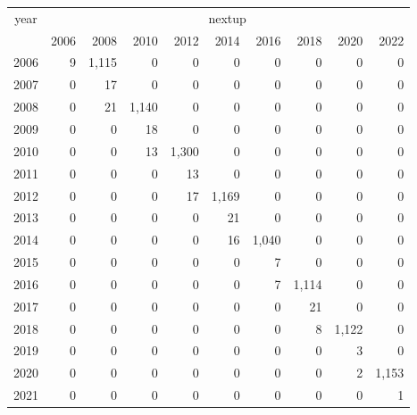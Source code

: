 \footnotesize\begin{tabular}[t]{lrrrrrrrrr}
\toprule
\multicolumn{1}{c}{year} & \multicolumn{9}{c}{nextup} \\
\cmidrule(l{3pt}r{3pt}){1-1} \cmidrule(l{3pt}r{3pt}){2-10}
  & 2006 & 2008 & 2010 & 2012 & 2014 & 2016 & 2018 & 2020 & 2022\\
\midrule
2006 & 9 & 1,115 & 0 & 0 & 0 & 0 & 0 & 0 & 0\\
2007 & 0 & 17 & 0 & 0 & 0 & 0 & 0 & 0 & 0\\
2008 & 0 & 21 & 1,140 & 0 & 0 & 0 & 0 & 0 & 0\\
2009 & 0 & 0 & 18 & 0 & 0 & 0 & 0 & 0 & 0\\
2010 & 0 & 0 & 13 & 1,300 & 0 & 0 & 0 & 0 & 0\\
2011 & 0 & 0 & 0 & 13 & 0 & 0 & 0 & 0 & 0\\
2012 & 0 & 0 & 0 & 17 & 1,169 & 0 & 0 & 0 & 0\\
2013 & 0 & 0 & 0 & 0 & 21 & 0 & 0 & 0 & 0\\
2014 & 0 & 0 & 0 & 0 & 16 & 1,040 & 0 & 0 & 0\\
2015 & 0 & 0 & 0 & 0 & 0 & 7 & 0 & 0 & 0\\
2016 & 0 & 0 & 0 & 0 & 0 & 7 & 1,114 & 0 & 0\\
2017 & 0 & 0 & 0 & 0 & 0 & 0 & 21 & 0 & 0\\
2018 & 0 & 0 & 0 & 0 & 0 & 0 & 8 & 1,122 & 0\\
2019 & 0 & 0 & 0 & 0 & 0 & 0 & 0 & 3 & 0\\
2020 & 0 & 0 & 0 & 0 & 0 & 0 & 0 & 2 & 1,153\\
2021 & 0 & 0 & 0 & 0 & 0 & 0 & 0 & 0 & 1\\
\bottomrule
\end{tabular}

